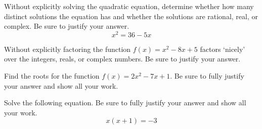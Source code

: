 \documentclass[11pt,letterpaper]{article}
\begin{document}

 Without explicitly solving the quadratic equation, determine whether how many distinct solutions the equation has and whether the solutions are rational, real, or complex. Be sure to justify your answer.
	\[
	x^2= 36 - 5x
	\]



\newpage



 Without explicitly factoring the function $f(x)= x^2 - 8x + 5$ factors `nicely' over the integers, reals, or complex numbers. Be sure to justify your answer. 



\newpage



 Find the roots for the function $f(x)= 2x^2 - 7x + 1$. Be sure to fully justify your answer and show all your work.



\newpage



 Solve the following equation. Be sure to fully justify your answer and show all your work.
	\[
	x(x + 1)= -3
	\]
\end{document}
